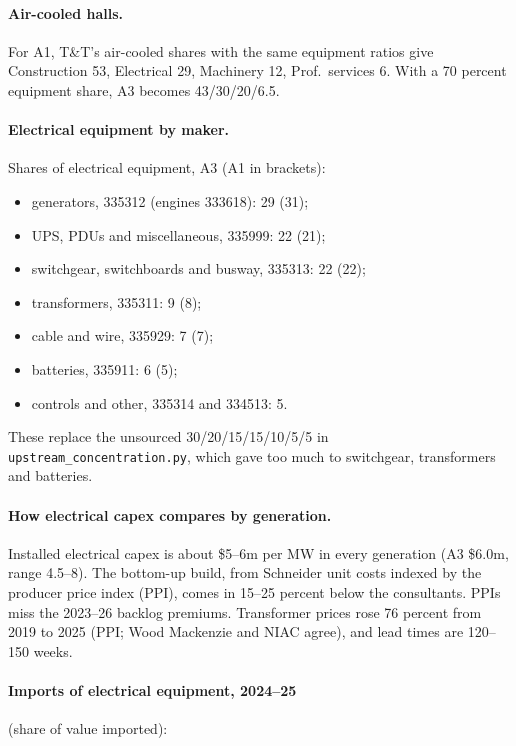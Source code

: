 \paragraph{Air-cooled halls.} For A1, T\&T's air-cooled shares with the same equipment ratios give
Construction 53, Electrical 29, Machinery 12, Prof.\ services 6. With a 70 percent equipment
share, A3 becomes 43/30/20/6.5.

\paragraph{Electrical equipment by maker.} Shares of electrical equipment, A3 (A1 in brackets):
\begin{itemize}
  \item generators, 335312 (engines 333618): 29 (31);
  \item UPS, PDUs and miscellaneous, 335999: 22 (21);
  \item switchgear, switchboards and busway, 335313: 22 (22);
  \item transformers, 335311: 9 (8);
  \item cable and wire, 335929: 7 (7);
  \item batteries, 335911: 6 (5);
  \item controls and other, 335314 and 334513: 5.
\end{itemize}
These replace the unsourced 30/20/15/15/10/5/5 in \texttt{upstream\_concentration.py}, which gave
too much to switchgear, transformers and batteries.

\paragraph{How electrical capex compares by generation.} Installed electrical capex is about
\$5--6m per MW in every generation (A3 \$6.0m, range 4.5--8). The bottom-up build, from
Schneider unit costs indexed by the producer price index (PPI), comes in 15--25 percent below
the consultants. PPIs miss the 2023--26 backlog premiums. Transformer prices rose 76 percent from
2019 to 2025 (PPI; Wood Mackenzie and NIAC agree), and lead times are 120--150 weeks.

\paragraph{Imports of electrical equipment, 2024--25} (share of value imported):

